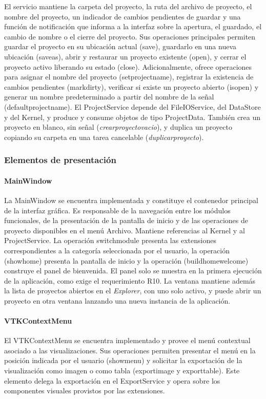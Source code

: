 \documentclass[11pt,a4paper]{article}
\DeclareRobustCommand{\_}{\textunderscore\allowbreak}
\begin{document}
El servicio mantiene la carpeta del proyecto, la ruta del archivo de proyecto, 
el nombre del proyecto, un indicador de cambios pendientes de guardar y una función 
de notificación que informa a la interfaz sobre la apertura, el guardado, el cambio 
de nombre o el cierre del proyecto. Sus operaciones principales permiten guardar 
el proyecto en su ubicación actual (save), guardarlo en una nueva ubicación 
(save\_as), abrir y restaurar un proyecto existente (open), y cerrar el proyecto
 activo liberando su estado (close). Adicionalmente, ofrece operaciones para asignar
  el nombre del proyecto (set\_project\_name), registrar la existencia de cambios 
  pendientes (mark\_dirty), verificar si existe un proyecto abierto (is\_open) y 
  generar un nombre predeterminado a partir del nombre de la señal 
  (default\_project\_name). El ProjectService depende del FileIOService,
     del DataStore y del Kernel, y produce y consume objetos de tipo ProjectData.
También crea un proyecto en blanco, sin señal (\textit{crear\_proyecto\_vacio}), y duplica
un proyecto copiando su carpeta en una tarea cancelable (\textit{duplicar\_proyecto}).

\subsubsection{Elementos de presentación}

\paragraph{MainWindow}
La MainWindow se encuentra implementada y constituye el contenedor principal de la interfaz gráfica. Es responsable de la navegación entre los módulos funcionales, de la presentación de la pantalla de inicio y de las operaciones de proyecto disponibles en el menú Archivo. Mantiene referencias al Kernel y al ProjectService. La operación switch\_module presenta las extensiones correspondientes a la categoría seleccionada por el usuario, la operación (show\_home) presenta la pantalla de inicio y la operación (build\_home\_welcome) construye el panel de bienvenida. El panel solo se muestra en la primera ejecución de la aplicación, como exige el requerimiento R10. La ventana mantiene además la lista de proyectos abiertos en el \textit{Explorer}, con uno solo activo, y puede abrir un proyecto en otra ventana lanzando una nueva instancia de la aplicación.

\paragraph{VTKContextMenu}
El VTKContextMenu se encuentra implementado y provee el menú contextual asociado a las visualizaciones. Sus operaciones permiten presentar el menú en la posición indicada por el usuario (show\_menu) y solicitar la exportación de la visualización como imagen o como tabla (export\_image y export\_table). Este elemento delega la exportación en el ExportService y opera sobre los componentes visuales provistos por las extensiones.
\end{document}
